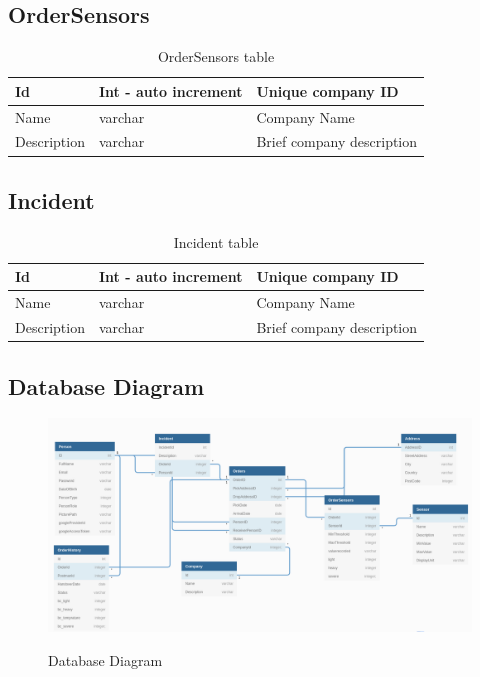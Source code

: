 \subsection{OrderSensors}
\begin{table}[!ht]
\begin{center}
\begin{tabular}{ |l|l|l| } 
 \hline
Id & Int - auto increment & Unique company ID \\
 \hline
Name & varchar & Company Name \\
 \hline
Description & varchar & Brief company description \\
 \hline
\end{tabular}
\end{center}
    \caption{OrderSensors table}
\end{table}

\subsection{Incident}
\begin{table}[!ht]
\begin{center}
\begin{tabular}{ |l|l|l| } 
 \hline
Id & Int - auto increment & Unique company ID \\
 \hline
Name & varchar & Company Name \\
 \hline
Description & varchar & Brief company description \\
 \hline
\end{tabular}
\end{center}
    \caption{Incident table}
\end{table}

\subsection{Database Diagram}
\begin{figure}[!ht]
	\centering
	\includegraphics[width=1\textwidth]{images/IOSLDBDiagramlatex.png}\\
	\caption{Database Diagram}
	\label{fig:Database Diagram}
\end{figure}
